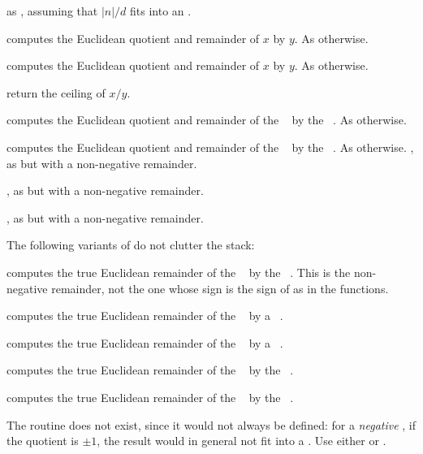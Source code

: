  as , assuming
that $|n|/d$ fits into an .

computes the Euclidean quotient and remainder of $x$ by $y$. As
 otherwise.

computes the Euclidean quotient and remainder of $x$ by $y$. As
 otherwise.

 return the ceiling of $x / y$.

 computes the Euclidean quotient
and remainder of the ~ by the ~. As
 otherwise.

 computes the Euclidean quotient
and remainder of the ~ by the ~. As
 otherwise.
\smallskip
{}, as  but with a
non-negative remainder.

, as  but with a
non-negative remainder.

, as  but with a
non-negative remainder.

 The following variants of  do not
clutter the stack:

 computes the true Euclidean
remainder of the ~ by the ~. This is the
non-negative remainder, not the one whose sign is the sign of 
as in the  functions.

 computes the true Euclidean
remainder of the ~ by a ~.

 computes the true Euclidean
remainder of the ~ by a ~.

 computes the true Euclidean
remainder of the ~ by the ~.

 computes the true Euclidean
remainder of the ~ by the ~.

The routine  does not exist, since it would not always be
defined: for a \emph{negative} , if the quotient is $\pm1$, the result
 would in general not fit into a . Use either
 or .


